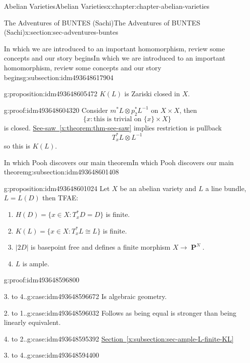 \documentclass[oneside,10pt,]{book}
\numberwithin{equation}{section}
\DeclareMathOperator{\PP}{\mathbf{P}}
\begin{document}
\begin{chapterptx}{Abelian Varieties}{}{Abelian Varieties}{}{}{x:chapter:chapter-abelian-varieties}
\begin{sectionptx}{The Adventures of BUNTES (Sachi)}{}{The Adventures of BUNTES (Sachi)}{}{}{x:section:sec-adventures-buntes}
\begin{subsectionptx}{In which we are introduced to an important homomorphism, review some concepts and our story begins}{}{In which we are introduced to an important homomorphism, review some concepts and our story begins}{}{}{g:subsection:idm493648617904}
\begin{proposition}{}{}{g:proposition:idm493648605472}
\(K(L)\) is Zariski closed in \(X\).%
\end{proposition}
\begin{proofptx}{}{g:proof:idm493648604320}
Consider \(m^* L \otimes p_2^*L^{-1}\) on \(X\times X\), then%
\begin{equation*}
\{x : \text{this is trivial on }\{x\}\times X\}
\end{equation*}
is closed. \hyperref[x:theorem:thm-see-saw]{See-saw~\ref{x:theorem:thm-see-saw}} implies restriction is pullback%
\begin{equation*}
T_x^*L \otimes L^{-1}
\end{equation*}
so this is \(K(L)\).%
\end{proofptx}
\end{subsectionptx}
%
%
\typeout{************************************************}
\typeout{************************************************}
%
\begin{subsectionptx}{In which Pooh discovers our main theorem}{}{In which Pooh discovers our main theorem}{}{}{g:subsection:idm493648601408}
\begin{proposition}{}{}{g:proposition:idm493648601024}%
Let \(X\) be an abelian variety and \(L\) a line bundle, \(L = L(D)\) then TFAE:%
\begin{enumerate}
\item{}\(H(D) = \{x\in X: T_x^*D  = D \}\) is finite.%
\item{}\(K(L) = \{x\in X: T_x^*L  \cong L \}\) is finite.%
\item{}\(|2D|\) is basepoint free and defines a finite morphism \(X\to \PP^N\).%
\item{}\(L\) is ample.%
\end{enumerate}
%
\end{proposition}
\begin{proofptx}{}{g:proof:idm493648596800}
\begin{case}{}{3. to 4..}{g:case:idm493648596672}
Is algebraic geometry.%
\end{case}
\begin{case}{}{2. to 1..}{g:case:idm493648596032}
Follows as being equal is stronger than being linearly equivalent.%
\end{case}
\begin{case}{}{4. to 2..}{g:case:idm493648595392}
\hyperref[x:subsection:sec-ample-L-finite-KL]{Section~\ref{x:subsection:sec-ample-L-finite-KL}}%
\end{case}
\begin{case}{}{3. to 4..}{g:case:idm493648594400}

\end{case}
\end{proofptx}
\end{subsectionptx}
\end{sectionptx}
\end{chapterptx}
\end{document}
